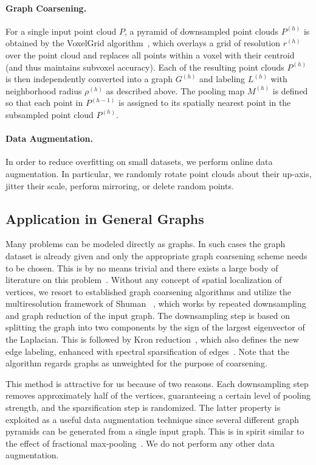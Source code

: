 \documentclass[10pt,twocolumn,letterpaper]{article}
\begin{document}
\paragraph*{Graph Coarsening.} For a single input point cloud $P$, a pyramid of downsampled point clouds $P^{(h)}$ is obtained by the VoxelGrid algorithm~\cite{pclrusu}, which overlays a grid of resolution $r^{(h)}$ over the point cloud and replaces all points within a voxel with their centroid (and thus maintains subvoxel accuracy). Each of the resulting point clouds $P^{(h)}$ is then independently converted into a graph $G^{(h)}$ and labeling $L^{(h)}$ with neighborhood radius $\rho^{(h)}$ as described above. The pooling map $M^{(h)}$ is defined so that each point in $P^{(h-1)}$ is assigned to its spatially nearest point in the subsampled point cloud $P^{(h)}$.

\paragraph*{Data Augmentation.} In order to reduce overfitting on small datasets, we perform online data augmentation. In particular, we randomly rotate point clouds about their up-axis, jitter their scale, perform mirroring, or delete random points.


\subsection{Application in General Graphs} \label{subsec:applgraphs}


Many problems can be modeled directly as graphs. In such cases the graph dataset is already given and only the appropriate graph coarsening scheme needs to be chosen. This is by no means trivial and there exists a large body of literature on this problem~\cite{safro14}. Without any concept of spatial localization of vertices, we resort to established graph coarsening algorithms and utilize the multiresolution framework of Shuman \etal~\cite{shumanFV16,gspbox}, which works by repeated downsampling and graph reduction of the input graph. The downsampling step is based on splitting the graph into two components by the sign of the largest eigenvector of the Laplacian. This is followed by Kron reduction~\cite{kron}, which also defines the new edge labeling, enhanced with spectral sparsification of edges~\cite{spielman2011graph}. Note that the algorithm regards graphs as unweighted for the purpose of coarsening.

This method is attractive for us because of two reasons. Each downsampling step removes approximately half of the vertices, guaranteeing a certain level of pooling strength, and the sparsification step is randomized. The latter property is exploited as a useful data augmentation technique since several different graph pyramids can be generated from a single input graph. This is in spirit similar to the effect of fractional max-pooling~\cite{fractpool}. We do not perform any other data augmentation.
\end{document}
